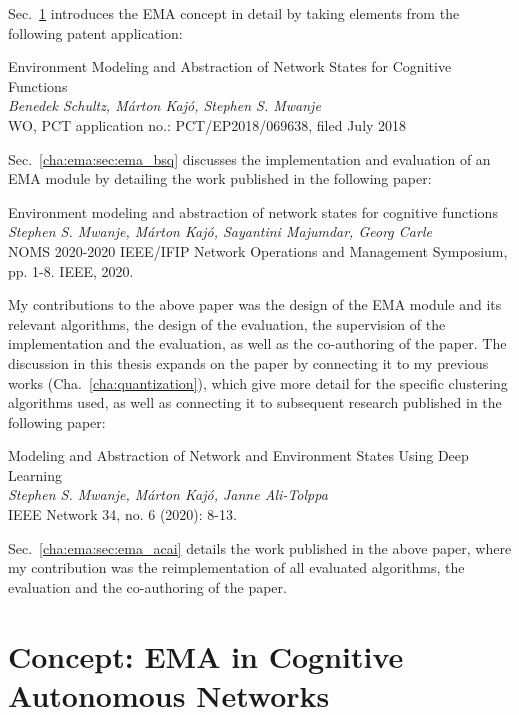 	Sec.~\ref{cha:ema:sec:ema} introduces the \ac{EMA} concept in detail by taking elements from the following patent application:
   	
	\begin{patent}
		Environment Modeling and Abstraction of Network States for Cognitive Functions \\
		\textit{Benedek Schultz, Márton Kajó, Stephen S. Mwanje} \\
		WO, PCT application no.: PCT/EP2018/069638, filed July 2018
	\end{patent}

	Sec.~\ref{cha:ema:sec:ema_bsq} discusses the implementation and evaluation of an \ac{EMA} module by detailing the work published in the following paper:

	\begin{publication}
		Environment modeling and abstraction of network states for cognitive functions \\
		\textit{Stephen S. Mwanje, Márton Kajó, Sayantini Majumdar, Georg Carle} \\
		NOMS 2020-2020 IEEE/IFIP Network Operations and Management Symposium, pp. 1-8. IEEE, 2020.
	\end{publication}	

	My contributions to the above paper was the design of the \ac{EMA} module and its relevant algorithms, the design of the evaluation, the supervision of the implementation and the evaluation, as well as the co-authoring of the paper.
	The discussion in this thesis expands on the paper by connecting it to my previous works (Cha.~\ref{cha:quantization}), which give more detail for the specific clustering algorithms used, as well as connecting it to subsequent research published in the following paper:

	\begin{publication}
		Modeling and Abstraction of Network and Environment States Using Deep Learning \\
		\textit{Stephen S. Mwanje, Márton Kajó, Janne Ali-Tolppa} \\
		IEEE Network 34, no. 6 (2020): 8-13.
	\end{publication}	
	
   	Sec.~\ref{cha:ema:sec:ema_acai} details the work published in the above paper, where my contribution was the reimplementation of all evaluated algorithms, the evaluation and the co-authoring of the paper.   	

	\section{Concept: EMA in Cognitive Autonomous Networks}
		\label{cha:ema:sec:ema}
	
